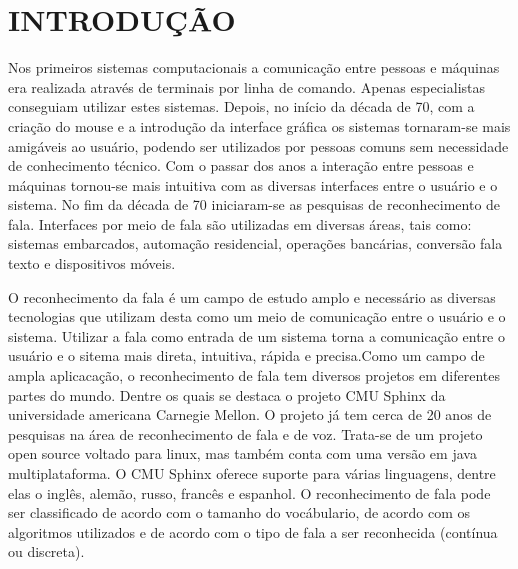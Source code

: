 \chapter{INTRODUÇÃO}
\label{chap:introducao}
 \thispagestyle{plain}


\quad Nos primeiros sistemas computacionais a comunicação entre pessoas e máquinas era realizada através de terminais por linha de comando.  Apenas especialistas conseguiam utilizar estes sistemas.
Depois, no início da década de 70, com a criação do mouse e a introdução da interface gráfica  os sistemas tornaram-se mais amigáveis ao usuário, podendo ser utilizados por pessoas comuns sem necessidade de conhecimento técnico. Com o passar dos anos a interação entre pessoas e máquinas tornou-se mais intuitiva com as diversas interfaces entre o usuário e o sistema. No fim da década de 70 iniciaram-se as pesquisas de reconhecimento de fala.
Interfaces por meio de fala são utilizadas em diversas áreas, tais como: sistemas embarcados, automação residencial, operações bancárias, conversão fala texto e dispositivos móveis.

\quad O reconhecimento da fala é um campo de estudo amplo e necessário as diversas tecnologias que utilizam
desta como um  meio de comunicação entre o usuário e o sistema. Utilizar a fala como entrada de um sistema
torna a comunicação entre o usuário e o sitema mais direta, intuitiva, rápida e precisa.Como um campo de ampla aplicacação, o reconhecimento de fala tem diversos projetos em diferentes partes do mundo. Dentre os quais se destaca o projeto CMU Sphinx da universidade americana Carnegie Mellon. O projeto já tem cerca de 20 anos de pesquisas na área de reconhecimento de fala e de voz. Trata-se de um projeto open source voltado para linux, mas também conta com uma versão em java multiplataforma. O CMU Sphinx oferece suporte para várias linguagens, dentre elas o inglês, alemão, russo, francês e espanhol. 
O reconhecimento de fala pode ser classificado de acordo com o tamanho do vocábulario, de acordo com os algoritmos utilizados e de acordo com o tipo de fala a ser reconhecida (contínua ou discreta).




